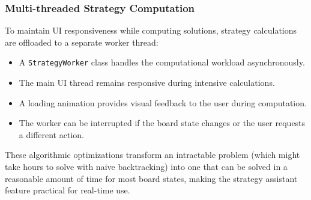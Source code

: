\subsubsection{Multi-threaded Strategy Computation}
To maintain UI responsiveness while computing solutions, strategy calculations are offloaded to a separate worker thread:
\begin{itemize}
    \item A \texttt{StrategyWorker} class handles the computational workload asynchronously.
    \item The main UI thread remains responsive during intensive calculations.
    \item A loading animation provides visual feedback to the user during computation.
    \item The worker can be interrupted if the board state changes or the user requests a different action.
\end{itemize}

These algorithmic optimizations transform an intractable problem (which might take hours to solve with naive backtracking) into one that can be solved in a reasonable amount of time for most board states, making the strategy assistant feature practical for real-time use.
